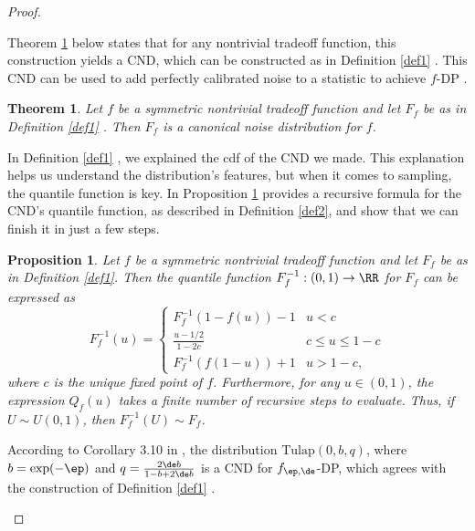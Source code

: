 \documentclass{article}
\newtheorem{thm}{Theorem}
\newtheorem{prop}{Proposition}
\begin{document}
\begin{proof}
\begin{enumerate}
    Theorem \ref{thm1} \parencite{awan2023canonical} below states that for any nontrivial tradeoff function, this construction yields a CND, which can be constructed as in Definition \ref{def1} \parencite{awan2023canonical}. This CND can be used to add perfectly calibrated noise to a statistic to achieve $f$-DP \parencite{dong2019gaussian}. 
    
    \begin{thm} \label{thm1}  %
    Let $f$ be a symmetric nontrivial tradeoff function and let $F_f$ be as in Definition \ref{def1} \parencite{awan2023canonical}. Then $F_f$ is a canonical noise distribution for $f$. 
    \end{thm}
    
    In Definition \ref{def1} \parencite{awan2023canonical}, we explained the cdf of the CND we made. This explanation helps us understand the distribution's features, but when it comes to sampling, the quantile function is key. In Proposition \ref{prop1} \parencite{awan2023canonical} provides a recursive formula for the CND's quantile function, as described in Definition \ref{def2}\parencite{awan2023canonical}, and show that we can finish it in just a few steps.

    \begin{prop}\label{prop1}   %
      Let $f$ be a symmetric nontrivial tradeoff function and let $F_f$ be as in Definition \ref{def1}. Then the quantile function $F_f^{-1}:(0,1)\rightarrow \RR$ for $F_f$ can be expressed as
      \[F_f^{-1}(u) = \begin{cases}
      F_f^{-1}(1-f(u))-1&u<c\\
      \frac{u-1/2}{1-2c}&c\leq u\leq 1-c\\
      F_f^{-1}(f(1-u))+1&u>1-c,
      \end{cases}\]
      where $c$ is the unique fixed point of $f$. {Furthermore, for any $u\in (0,1)$, the expression $Q_f(u)$ takes a finite number of recursive steps to evaluate. Thus,} if $U\sim U(0,1)$, then $F_f^{-1}(U) \sim F_f$. 
    \end{prop}
    
    According to Corollary 3.10 in \cite{awan2023canonical}, the distribution $\mathrm{Tulap}(0,b,q)$, where $b=\exp(-\ep)$ and $q = \frac{2\de b}{1-b+2\de b}$ is a CND for $f_{\ep,\de}$-DP, which agrees with the construction of Definition \ref{def1} \parencite{awan2023canonical}. 
    

\end{enumerate}
\end{proof}
\end{document}
